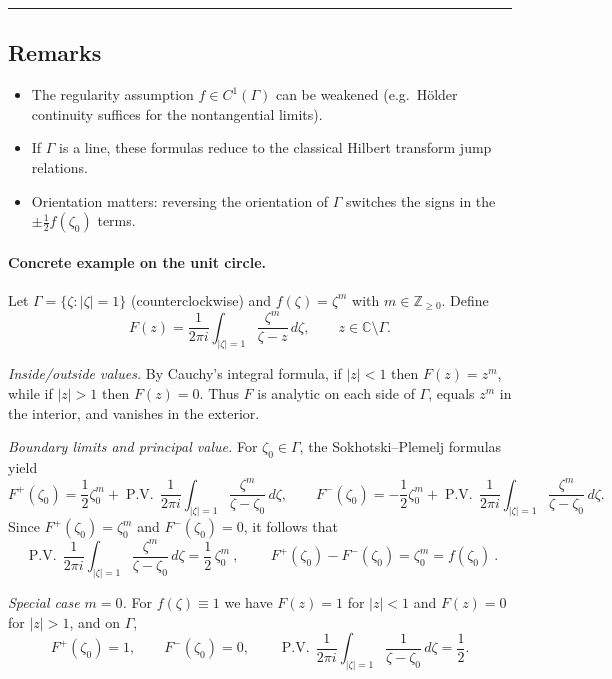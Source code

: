 \documentclass[11pt]{article}
\begin{document}
\bigskip\hrule\bigskip

\subsection*{Remarks}

\begin{itemize}
\item The regularity assumption $f\in C^1(\Gamma)$ can be weakened (e.g.\ H\"older continuity suffices for the nontangential limits).
\item If $\Gamma$ is a line, these formulas reduce to the classical Hilbert transform jump relations.
\item Orientation matters: reversing the orientation of $\Gamma$ switches the signs in the $\pm\tfrac12 f(\zeta_0)$ terms.
\end{itemize}

\paragraph{Concrete example on the unit circle.}
Let $\Gamma=\{\zeta:|\zeta|=1\}$ (counterclockwise) and $f(\zeta)=\zeta^{m}$ with $m\in\mathbb{Z}_{\ge0}$.
Define
\[
F(z)=\frac{1}{2\pi i}\int_{|\zeta|=1}\frac{\zeta^{m}}{\zeta-z}\,d\zeta,\qquad z\in\mathbb{C}\setminus\Gamma.
\]

\emph{Inside/outside values.}
By Cauchy’s integral formula, if $|z|<1$ then $F(z)=z^{m}$, while if $|z|>1$ then $F(z)=0$.
Thus $F$ is analytic on each side of $\Gamma$, equals $z^{m}$ in the interior, and vanishes in the exterior.

\medskip

\emph{Boundary limits and principal value.}
For $\zeta_{0}\in\Gamma$, the Sokhotski--Plemelj formulas yield
\[
F^{+}(\zeta_{0})
=\frac{1}{2}\zeta_{0}^{m}
+\operatorname{P.V.}\,\frac{1}{2\pi i}\!\int_{|\zeta|=1}\frac{\zeta^{m}}{\zeta-\zeta_{0}}\,d\zeta,
\qquad
F^{-}(\zeta_{0})
=-\frac{1}{2}\zeta_{0}^{m}
+\operatorname{P.V.}\,\frac{1}{2\pi i}\!\int_{|\zeta|=1}\frac{\zeta^{m}}{\zeta-\zeta_{0}}\,d\zeta.
\]
Since $F^{+}(\zeta_{0})=\zeta_{0}^{m}$ and $F^{-}(\zeta_{0})=0$, it follows that
\[
\boxed{\ \operatorname{P.V.}\,\frac{1}{2\pi i}\!\int_{|\zeta|=1}\frac{\zeta^{m}}{\zeta-\zeta_{0}}\,d\zeta
=\frac{1}{2}\,\zeta_{0}^{m}\ },
\qquad
\boxed{\ F^{+}(\zeta_{0})-F^{-}(\zeta_{0})=\zeta_{0}^{m}=f(\zeta_{0})\ }.
\]

\medskip

\emph{Special case $m=0$.}
For $f(\zeta)\equiv 1$ we have $F(z)=1$ for $|z|<1$ and $F(z)=0$ for $|z|>1$, and on $\Gamma$,
\[
F^{+}(\zeta_{0})=1,\qquad F^{-}(\zeta_{0})=0,\qquad
\operatorname{P.V.}\,\frac{1}{2\pi i}\!\int_{|\zeta|=1}\frac{1}{\zeta-\zeta_{0}}\,d\zeta=\frac{1}{2}.
\]
\end{document}
